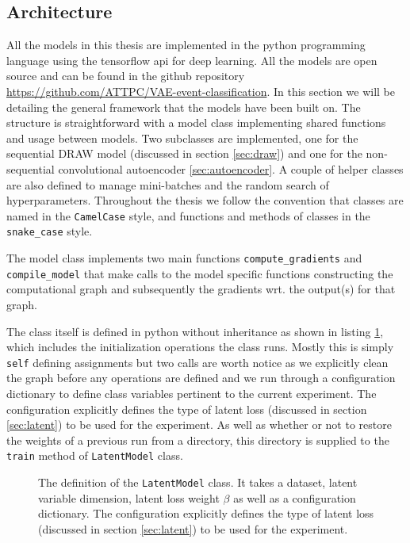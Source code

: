 \subsection{Architecture}

All the models in this thesis are implemented in the python programming language using the tensorflow api for deep learning. All the models are open source and can be found in the github repository \url{https://github.com/ATTPC/VAE-event-classification}. In this section we will be detailing the general framework that the models have been built on. The structure is straightforward with a model class implementing shared functions and usage between models. Two subclasses are implemented, one for the sequential DRAW model (discussed in section \ref{sec:draw}) and one for the non-sequential convolutional autoencoder \ref{sec:autoencoder}. A couple of helper classes are also defined to manage mini-batches and the random search of hyperparameters. Throughout the thesis we follow the convention that classes are named in the \lstinline{CamelCase} style, and functions and methods of classes in the \lstinline{snake_case} style.  

The model class implements two main functions \lstinline{compute_gradients} and \lstinline{compile_model} that make calls to the model specific functions constructing the computational graph and subsequently the gradients wrt. the output(s) for that graph. 

The class itself is defined in python without inheritance as shown in listing \ref{code:defmodel}, which includes the initialization operations the class runs. Mostly this is simply \lstinline{self} defining assignments but two calls are worth notice as we explicitly clean the graph before any operations are defined and we run through a configuration dictionary to define class variables pertinent to the current experiment. The configuration explicitly defines the type of latent loss (discussed in section \ref{sec:latent}) to be used for the experiment. As well as whether or not to restore the weights of a previous run from a directory, this directory is supplied to the \lstinline{train} method of \lstinline{LatentModel} class. 

\begin{figure}[H]

\caption{The definition of the \lstinline{LatentModel} class. It takes a dataset, latent variable dimension, latent loss weight $\beta$ as well as a configuration dictionary. The configuration explicitly defines the type of latent loss (discussed in section \ref{sec:latent}) to be used for the experiment.}\label{code:defmodel}
\end{figure}

